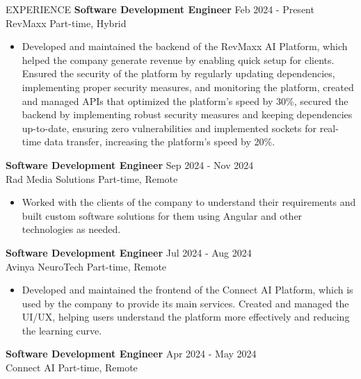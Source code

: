 \documentclass{resume}
\begin{document}
\vspace{-0.4em}
\begin{rSection}{EXPERIENCE}
  {\bf Software Development Engineer} \hfill {Feb 2024 - Present}\\
  RevMaxx \hfill {Part-time, Hybrid}
  \vspace{-0.4em}
  \begin{itemize}
    \item{Developed and maintained the backend of the RevMaxx AI Platform, which helped the company generate revenue by enabling quick setup for clients. Ensured the security of the platform by regularly updating dependencies, implementing proper security measures, and monitoring the platform, created and managed APIs that optimized the platform's speed by 30\%, secured the backend by implementing robust security measures and keeping dependencies up-to-date, ensuring zero vulnerabilities and implemented sockets for real-time data transfer, increasing the platform's speed by 20\%.}
  \end{itemize}
  \vspace{-0.4em}
  {\bf Software Development Engineer} \hfill {Sep 2024 - Nov 2024}\\
  Rad Media Solutions \hfill {Part-time, Remote}
  \vspace{-0.4em}
  \begin{itemize}
    \item{Worked with the clients of the company to understand their requirements and built custom software solutions for them using Angular and other technologies as needed.}
  \end{itemize}
  \vspace{-0.4em}
  {\bf Software Development Engineer} \hfill {Jul 2024 - Aug 2024}\\
  Avinya NeuroTech \hfill {Part-time, Remote}
  \vspace{-0.4em}
  \begin{itemize}
    \item{Developed and maintained the frontend of the Connect AI Platform, which is used by the company to provide its main services. Created and managed the UI/UX, helping users understand the platform more effectively and reducing the learning curve.}
  \end{itemize}
  \vspace{-0.4em}
  {\bf Software Development Engineer} \hfill {Apr 2024 - May 2024}\\
  Connect AI \hfill {Part-time, Remote}
  \vspace{-0.4em}

\end{rSection}
\end{document}

